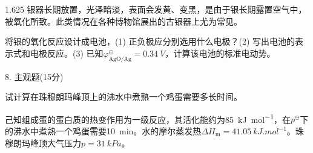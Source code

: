 \documentclass[12pt, b5paper]{article}
\begin{document}
\begin{spacing}{1.625}
银器长期放置，光泽暗淡，表面会发黄、变黑，是由于银长期露置空气中，被氧化所致。此类情况在各种博物馆展出的古银器上尤为常见。

\centerline{}

将银的氧化反应设计成电池，(1) 正负极应分别选用什么电极？(2) 写出电池的表示式和电极反应。(3) 已知$\varphi_\mathrm{AgO/Ag}^\ominus = \SI{0.34}{V}$，计算该电池的标准电动势。

\bigskip

\bigskip

8. 主观题(15分)

试计算在珠穆朗玛峰顶上的沸水中煮熟一个鸡蛋需要多长时间。

己知组成蛋的蛋白质的热变作用为一级反应，其活化能约为\SI{85}{kJ.mol^{-1}}，在$p^\ominus$下的沸水中煮熟一个鸡蛋需要\SI{10}{min}。水的摩尔蒸发热$\Delta H_\mathrm{m} = \SI{41.05}{kJ.mol^{-1}}$。珠穆朗玛峰顶大气压力$p=\SI{31}{kPa}$。



\end{spacing}
\end{document}
